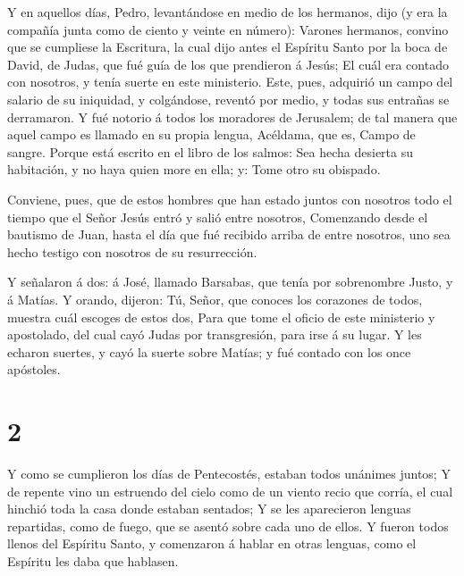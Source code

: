  Y en aquellos días, Pedro, levantándose en medio de los
hermanos, dijo (y era la compañía junta como de ciento y veinte en
número):  Varones hermanos, convino que se cumpliese la
Escritura, la cual dijo antes el Espíritu Santo por la boca de David, de
Judas, que fué guía de los que prendieron á Jesús;  El cuál
era contado con nosotros, y tenía suerte en este ministerio.
 Este, pues, adquirió un campo del salario de su iniquidad,
y colgándose, reventó por medio, y todas sus entrañas se derramaron.
 Y fué notorio á todos los moradores de Jerusalem; de tal
manera que aquel campo es llamado en su propia lengua, Acéldama, que es,
Campo de sangre.  Porque está escrito en el libro de los
salmos: Sea hecha desierta su habitación, y no haya quien more en ella;
y: Tome otro su obispado.

 Conviene, pues, que de estos hombres que han estado juntos
con nosotros todo el tiempo que el Señor Jesús entró y salió entre
nosotros,  Comenzando desde el bautismo de Juan, hasta el
día que fué recibido arriba de entre nosotros, uno sea hecho testigo con
nosotros de su resurrección.

 Y señalaron á dos: á José, llamado Barsabas, que tenía por
sobrenombre Justo, y á Matías.  Y orando, dijeron: Tú,
Señor, que conoces los corazones de todos, muestra cuál escoges de estos
dos,  Para que tome el oficio de este ministerio y
apostolado, del cual cayó Judas por transgresión, para irse á su lugar.
 Y les echaron suertes, y cayó la suerte sobre Matías; y
fué contado con los once apóstoles.

\hypertarget{section-1}{%
\section{2}\label{section-1}}

 Y como se cumplieron los días de Pentecostés, estaban todos
unánimes juntos;  Y de repente vino un estruendo del cielo
como de un viento recio que corría, el cual hinchió toda la casa donde
estaban sentados;  Y se les aparecieron lenguas repartidas,
como de fuego, que se asentó sobre cada uno de ellos.  Y
fueron todos llenos del Espíritu Santo, y comenzaron á hablar en otras
lenguas, como el Espíritu les daba que hablasen.


